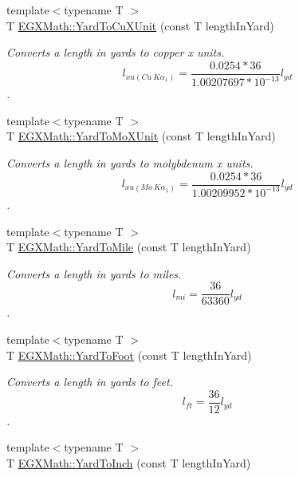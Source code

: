 \begin{DoxyCompactItemize}
{\footnotesize template$<$typename T $>$ }\\T \mbox{\hyperlink{group___e_g_x_math-_conversions-_length_conversions-_imperial-_yard-_non-_s_i_gabf4916569d4002f5c0ec8bbef8207980}{E\+G\+X\+Math\+::\+Yard\+To\+Cu\+X\+Unit}} (const T length\+In\+Yard)
\begin{DoxyCompactList}\small\item\em Converts a length in yards to copper x units. \[ l_{xu(Cu\ K\alpha_1)}=\frac{0.0254 * 36}{1.00207697*10^{-13}} l_{yd}\]. \end{DoxyCompactList}\item 
{\footnotesize template$<$typename T $>$ }\\T \mbox{\hyperlink{group___e_g_x_math-_conversions-_length_conversions-_imperial-_yard-_non-_s_i_ga81f1fa776a2154865e8ee4be46ef693d}{E\+G\+X\+Math\+::\+Yard\+To\+Mo\+X\+Unit}} (const T length\+In\+Yard)
\begin{DoxyCompactList}\small\item\em Converts a length in yards to molybdenum x units. \[ l_{xu(Mo\ K\alpha_1)}=\frac{0.0254 * 36}{1.00209952*10^{-13}} l_{yd}\]. \end{DoxyCompactList}\item 
{\footnotesize template$<$typename T $>$ }\\T \mbox{\hyperlink{group___e_g_x_math-_conversions-_length_conversions-_imperial-_yard-_imperial_ga8bd451c3f9a1af1afb769812587d7dc6}{E\+G\+X\+Math\+::\+Yard\+To\+Mile}} (const T length\+In\+Yard)
\begin{DoxyCompactList}\small\item\em Converts a length in yards to miles. \[ l_{mi}=\frac{36}{63360} l_{yd} \]. \end{DoxyCompactList}\item 
{\footnotesize template$<$typename T $>$ }\\T \mbox{\hyperlink{group___e_g_x_math-_conversions-_length_conversions-_imperial-_yard-_imperial_gaa61dd96db004bb07d9fca00a214fe265}{E\+G\+X\+Math\+::\+Yard\+To\+Foot}} (const T length\+In\+Yard)
\begin{DoxyCompactList}\small\item\em Converts a length in yards to feet. \[ l_{ft}= \frac{36}{12} l_{yd} \]. \end{DoxyCompactList}\item 
{\footnotesize template$<$typename T $>$ }\\T \mbox{\hyperlink{group___e_g_x_math-_conversions-_length_conversions-_imperial-_yard-_imperial_ga081865589d8e67f705080fcc6a7dabe3}{E\+G\+X\+Math\+::\+Yard\+To\+Inch}} (const T length\+In\+Yard)

\end{DoxyCompactItemize}
